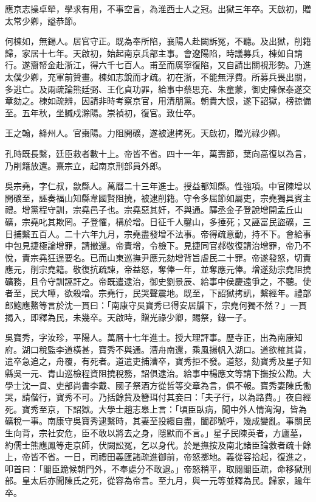 \begin{pinyinscope}
應京志操卓犖，學求有用，不事空言，為淮西士人之冠。出獄三年卒。天啟初，贈太常少卿，謚恭節。

何棟如，無錫人。居官守正。既為奉所陷，襄陽人赴闕訴冤，不聽。及出獄，削籍歸，家居十七年。天啟初，始起南京兵部主事。會遼陽陷，時議募兵，棟如自請行。遂齎帑金赴浙江，得六千七百人。甫至而廣寧復陷，又自請出關視形勢。乃進太僕少卿，充軍前贊畫。棟如志銳而才疏。初在浙，不能無浮費。所募兵畏出關，多逃亡。及兩疏論熊廷弼、王化貞功罪，給事中蔡思充、朱童蒙，御史陳保泰遂交章劾之。棟如疏辨，因請非時考察京官，用清朋黨。朝貴大恨，遂下詔獄，榜掠備至。五年秋，坐贓戍滁陽。崇禎初，復官。致仕卒。

王之翰，絳州人。官棗陽。力阻開礦，遂被逮拷死。天啟初，贈光祿少卿。

孔時既長繫，廷臣救者數十上。帝皆不省。四十一年，萬壽節，葉向高復以為言，乃削籍放還。熹宗立，起南京刑部員外郎。

吳宗堯，字仁叔，歙縣人。萬曆二十三年進士。授益都知縣。性強項。中官陳增以開礦至，誣奏福山知縣韋國賢阻撓，被逮削籍。守令多屈節如屬吏，宗堯獨具賓主禮。增黨程守訓，宗堯邑子也。宗堯惡其奸，不與通。驛丞金子登說增開孟丘山礦，宗堯叱其欺罔。子登懼，構於增。日征千人鑿山，多捶死；又誣富民盜礦，三日捕繫五百人。二十六年九月，宗堯盡發增不法事。帝得疏意動，持不下。會給事中包見捷極論增罪，請撤還。帝責增，令檢下。見捷同官郝敬復請治增罪，帝乃不悅，責宗堯狂逞要名。已而山東巡撫尹應元劾增背旨虐民二十罪。帝遂發怒，切責應元，削宗堯籍。敬復抗疏諫，帝益怒，奪俸一年，並奪應元俸。增遂劾宗堯阻撓礦務，且令守訓誣訐之。帝既遣逮治，御史劉景辰、給事中侯慶遠爭之，不聽。使者至，民大嘩，欲殺增。宗堯行，民哭聲震地。既至，下詔獄拷訊，繫經年。禮部郎鮑應鰲等言於沈一貫曰：「南康守吳寶秀已得安居牖下，宗堯何獨不然？」一貫揭入，即釋為民，未幾卒。天啟時，贈光祿少卿，賜祭，錄一子。

吳寶秀，字汝珍，平陽人。萬曆十七年進士。授大理評事。歷寺正，出為南康知府。湖口稅監李道橫甚，寶秀不與通。漕舟南還，乘風揚帆入湖口。道欲榷其貨，遣卒急追之，舟覆，有死者。道遣吏捕漕卒，寶秀拒不發。道怒，劾寶秀及星子知縣吳一元、青山巡檢程資阻撓稅務，詔俱逮治。給事中楊應文等請下撫按公勘。大學士沈一貫、吏部尚書李戴、國子祭酒方從哲等交章為言，俱不報。寶秀妻陳氏慟哭，請偕行，寶秀不可。乃括餘貲及簪珥付其妾曰：「夫子行，以為路費。」夜自經死。寶秀至京，下詔獄。大學士趙志皋上言：「頃臣臥病，聞中外人情洶洶，皆為礦稅一事。南康守吳寶秀逮繫時，其妻至投繯自盡，闔郡號呼，幾成變亂。事關民生向背，宗社安危，臣不敢以將去之身，隱默而不言。」星子民陳英者，方廬墓，約儒士熊應鳳等走京師，伏闕訟冤，乞以身代。於是撫按及南北諸臣論救者疏十餘上，帝皆不省。一日，司禮田義匯諸疏進御前，帝怒擲地。義從容拾起，復進之，叩首曰：「閣臣跪候朝門外，不奉處分不敢退。」帝怒稍平，取閱閣臣疏，命移獄刑部。皇太后亦聞陳氏之死，從容為帝言。至九月，與一元等並釋為民。歸家，踰年卒。


\end{pinyinscope}
